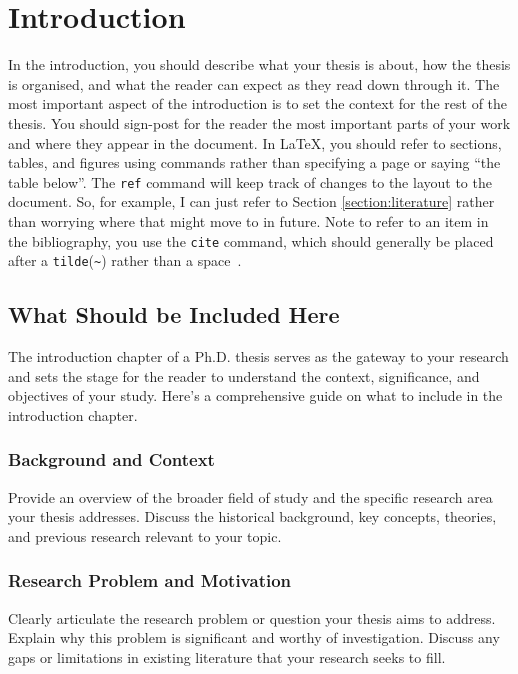 
\chapter{Introduction}
\label{section:introduction}

In the introduction, you should describe what your thesis is about, how the
thesis is organised, and what the reader can expect as they read down through
it.
The most important aspect of the introduction is to set the context for the
rest of the thesis.
You should sign-post for the reader the most important parts of your work and
where they appear in the document.
In \LaTeX, you should refer to sections, tables, and figures using commands
rather than specifying a page or saying ``the table below''. The \texttt{ref}
command will keep track of changes to the layout to the document. So, for
example, I can just refer to Section \ref{section:literature} rather than
worrying where that might move to in future.
Note to refer to an item in the bibliography, you use the \texttt{cite} command,
which should generally be placed after a \texttt{tilde}(\texttt{\~}) rather than
a space~\cite{einstein}.


\section{What Should be Included Here}
The introduction chapter of a Ph.D. thesis serves as the gateway to your research and sets the stage for the reader to understand the context, significance, and objectives of your study.
Here's a comprehensive guide on what to include in the introduction chapter.

\subsection{Background and Context}
Provide an overview of the broader field of study and the specific research area your thesis addresses.
Discuss the historical background, key concepts, theories, and previous research relevant to your topic.

\subsection{Research Problem and Motivation}
Clearly articulate the research problem or question your thesis aims to address.
Explain why this problem is significant and worthy of investigation.
Discuss any gaps or limitations in existing literature that your research seeks to fill.

